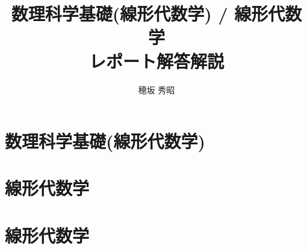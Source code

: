 \documentclass{jsbook}
\begin{document}
\frontmatter

\title{数理科学基礎(線形代数学) / 線形代数学\\レポート解答解説}
\author{穂坂 秀昭}

\maketitle



\tableofcontents

\mainmatter

\part{数理科学基礎(線形代数学)}\label{part1}








\part{線形代数学}\label{part2}		%









\renewcommand{\prepartname}{A}					%
\renewcommand{\thepart}{}						%
\renewcommand{\postpartname}{セメスター}		%

\part{線形代数学}\label{part3}		%

\renewcommand{\thepart}{\arabic{part}}			%















\backmatter

\printindex
\end{document}

